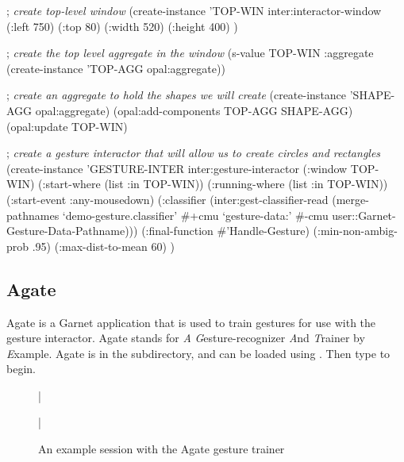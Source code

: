 \begin{group}
\begin{programexample}
; {\it create top-level window}
(create-instance 'TOP-WIN inter:interactor-window
   (:left 750) (:top 80) (:width 520) (:height 400)
)

; {\it create the top level aggregate in the window}
(s-value TOP-WIN :aggregate (create-instance 'TOP-AGG opal:aggregate))

; {\it create an aggregate to hold the shapes we will create}
(create-instance 'SHAPE-AGG opal:aggregate)
(opal:add-components TOP-AGG SHAPE-AGG)
(opal:update TOP-WIN)

; {\it create a gesture interactor that will allow us to create circles and rectangles}
(create-instance 'GESTURE-INTER inter:gesture-interactor
   (:window TOP-WIN)
   (:start-where (list :in TOP-WIN))
   (:running-where (list :in TOP-WIN))
   (:start-event :any-mousedown)
   (:classifier (inter:gest-classifier-read
                    (merge-pathnames `demo-gesture.classifier'
                        \#+cmu `gesture-data:'
                        \#-cmu user::Garnet-Gesture-Data-Pathname)))
   (:final-function \#'Handle-Gesture)
   (:min-non-ambig-prob .95)
   (:max-dist-to-mean 60)
)
\end{programexample}
\end{group}

\subsection{Agate}
\label{agate}

Agate is a Garnet application that is used to train gestures for use
with the gesture interactor.  Agate stands for {\it A}
{\it G}esture-recognizer {\it A}nd {\it T}rainer by {\it E}xample.
Agate is in the  subdirectory, and can be loaded using
.  Then type  to begin.

\begin{figure}
\bar{}
\begin{center}
\end{center}
\caption{An example session with the Agate gesture trainer}
\bar{}
\end{figure}

